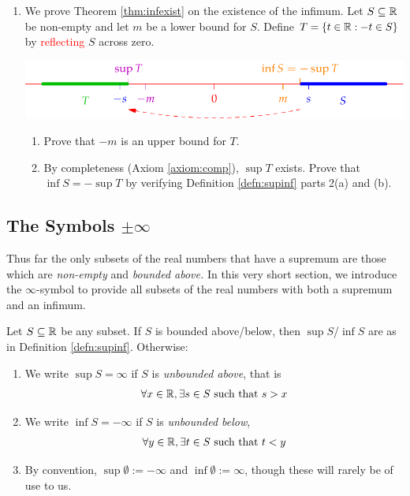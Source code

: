 \begin{exercises}{}{}
\begin{enumerate}
  
  	\item\label{exs:infexist} We prove Theorem \ref{thm:infexist} on the existence of the infimum.\smallbreak
	  Let $S\subseteq\mathbb{R}$ be non-empty and let $m$ be a lower bound for $S$. Define $T=\{t\in\mathbb{R}:-t\in S\}$ by \textcolor{red}{reflecting} $S$ across zero.
		\begin{center}
			\includegraphics{infexist2}
		\end{center}
		\begin{enumerate}
		  \item Prove that $-m$ is an upper bound for $T$.
			\item By completeness (Axiom \ref{axiom:comp}), $\sup T$ exists. Prove that $\inf S=-\sup T$ by verifying Definition \ref{defn:supinf} parts 2(a) and (b).
		\end{enumerate}
  
	\end{enumerate}
\end{exercises}


\clearpage


\subsection[The Symbols +/- Infinity]{The Symbols $\pm\infty$}

Thus far the only subsets of the real numbers that have a supremum are those which are \emph{non-empty} and \emph{bounded above.} In this very short section, we introduce the $\infty$-symbol to provide all subsets of the real numbers with both a supremum and an infimum.

\begin{defn}{}{}
	Let $S\subseteq\mathbb{R}$ be any subset. If $S$ is bounded above/below, then $\sup S$/$\inf S$ are as in Definition \ref{defn:supinf}. Otherwise:
	\begin{enumerate}
	  \item We write $\sup S=\infty$ if $S$ is \emph{unbounded above}, that is
	  \[
	  	\forall x\in \mathbb{R}, \exists s\in S\text{ such that }s>x
	  \]
	  \item We write $\inf S=-\infty$ if $S$ is \emph{unbounded below},
	  \[
	  	\forall y\in \mathbb{R}, \exists t\in S\text{ such that }t<y
	  \]
	  \item By convention, $\sup\emptyset:=-\infty$ and $\inf\emptyset:=\infty$, though these will rarely be of use to us.
	\end{enumerate}
\end{defn}

